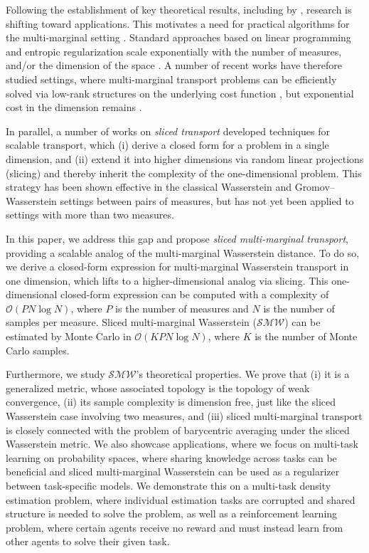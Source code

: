 Following the establishment of key theoretical results, including by \textcite{gangbo,journals/siamma/AguehC11, Pass2014MultimarginalOT}, research is shifting toward applications. This motivates a need for practical algorithms for the multi-marginal setting \cite{mw_compl}. 
Standard approaches based on linear programming and entropic regularization scale exponentially with the number of measures, and/or the dimension of the space \cite{benamou:hal-01096124, accmmot}. 
A number of recent works have therefore studied settings, where multi-marginal transport problems can be efficiently solved via low-rank structures on the underlying cost function \cite{altschuler_mm}, but exponential cost in the dimension remains \cite{altschulernpbary, altschuler_mm_np}. 


In parallel, a number of works on \emph{sliced transport} \cite{bonnottee} developed techniques for scalable transport, which (i) derive a closed form for a problem in a single dimension, and (ii) extend it into higher dimensions via random linear projections (slicing) and thereby inherit the complexity of the one-dimensional problem.
This strategy has been shown effective in the classical Wasserstein \cite{bonnottee,bonneel, gensliced, distributionalsliced, maxsliced, orthsliced} and Gromov--Wasserstein \cite{sliced_gw} settings between pairs of measures, but has not yet been applied to settings with more than two measures.


In this paper, we address this gap and propose \emph{sliced multi-marginal transport}, providing a scalable analog of the multi-marginal Wasserstein distance.
To do so, we derive a closed-form expression for multi-marginal Wasserstein transport in one dimension, which lifts to a higher-dimensional analog via slicing. 
This one-dimensional closed-form expression can be computed with a complexity of $\mathcal{O}(PN\log N)$, where $P$ is the number of measures and $N$ is the number of samples per measure. 
Sliced multi-marginal Wasserstein ($\mathcal{SMW}$) can be estimated by Monte Carlo in $\mathcal{O}(KPN\log N)$, where $K$ is the number of Monte Carlo samples. 

Furthermore, we study $\mathcal{SMW}$'s theoretical properties.
We prove that (i) it is a generalized metric, whose associated topology is the topology of weak convergence, (ii) its sample complexity is dimension free, just like the sliced Wasserstein case involving two measures, and (iii) sliced multi-marginal transport is closely connected with the problem of barycentric averaging under the sliced Wasserstein metric. 
%
We also showcase applications, where we focus on multi-task learning on probability spaces, where sharing knowledge across tasks can be beneficial and sliced multi-marginal Wasserstein can be used as a regularizer between task-specific models. 
We demonstrate this on a multi-task density estimation problem, where individual estimation tasks are corrupted and shared structure is needed to solve the problem, as well as a reinforcement learning problem, where certain agents receive no reward and must instead learn from other agents to solve their given task.


